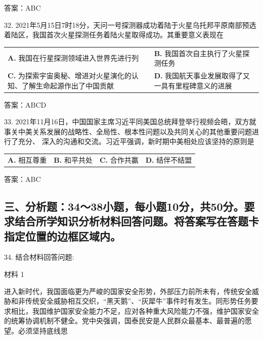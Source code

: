 \documentclass[UTF8,11pt]{ctexart}
\begin{document}
答案：ABC


32. 2021年5月15日7时18分，天问一号探测器成功着陆于火星乌托邦平原南部预选着陆区，我国首次火星探测任务着陆火星取得成功。其重要意义表现在


\begin{center}\begin{tabular}{>{\raggedright\arraybackslash}p{\dimexpr(\linewidth-4\tabcolsep)/2\relax}>{\raggedright\arraybackslash}p{\dimexpr(\linewidth-4\tabcolsep)/2\relax}}
\textbf{A.} 我国在行星探测领域进入世界先进行列 & \textbf{B.} 我国首次自主执行了火星探测任务\\[.35em]
\textbf{C.} 为探索宇宙奥秘、增进对火星演化的认知、了解生命起源作出了中国贡献 & \textbf{D.} 我国航天事业发展取得了又一具有里程碑意义的进展\\[.35em]\end{tabular}\end{center}

答案：ABCD


33. 2021年11月16日，中国国家主席习近平同美国总统拜登举行视频会晤，双方就事关中美关系发展的战略性、全局性、根本性问题以及共同关心的其他重要问题进行了充分、 深入的沟通和交流。习近平强调，新时期中美相处应该坚持的原则是


\begin{center}\begin{tabular}{>{\raggedright\arraybackslash}p{\dimexpr(\linewidth-8\tabcolsep)/4\relax}>{\raggedright\arraybackslash}p{\dimexpr(\linewidth-8\tabcolsep)/4\relax}>{\raggedright\arraybackslash}p{\dimexpr(\linewidth-8\tabcolsep)/4\relax}>{\raggedright\arraybackslash}p{\dimexpr(\linewidth-8\tabcolsep)/4\relax}}
\textbf{A.} 相互尊重 & \textbf{B.} 和平共处 & \textbf{C.} 合作共赢 & \textbf{D.} 结伴不结盟\\[.35em]\end{tabular}\end{center}

答案：ABC


\subsection*{三、分析题：34～38小题，每小题10分，共50分。要求结合所学知识分析材料回答问题。将答案写在答题卡指定位置的边框区域内。}

34. 结合材料回答问题:

材料 1

进入新时代，我国面临更为严峻的国家安全形势，外部压力前所未有，传统安全威胁和非传统安全威胁相互交织，“黑天鹅”、“灰犀牛”事件时有发生。同形势任务要求相比，我国维护国家安全能力不足，应对各种重大风险能力不强，维护国家安全的统筹协调机制不健全。党中央强调，国泰民安是人民群众最基本、最普遍的愿望。必须坚持底线思
\end{document}
